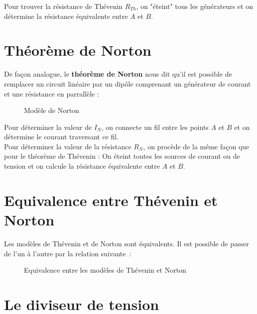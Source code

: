 Pour trouver la résistance de Thévenin $R_{Th}$, on "éteint" tous les générateurs et on détermine la résistance équivalente entre $A$ et $B$.

\section{Théorème de Norton}

De façon analogue, le \textbf{théorème de Norton} nous dit qu'il est possible de remplacer un circuit linéaire par un dipôle comprenant un générateur de courant et une résistance en parrallèle : 

\begin{figure}[!h]
\begin{center}
	
\end{center}
\caption{Modèle de Norton}
\end{figure}


Pour déterminer la valeur de $I_N$, on connecte un fil entre les points $A$ et $B$ et on détermine le courant traversant ce fil. \\

Pour déterminer la valeur de la résistance $R_N$, on procède de la même façon que pour le théorème de Thévenin : On éteint toutes les sources de courant ou de tension et on calcule la résistance équivalente entre $A$ et $B$.

\section{Equivalence entre Thévenin et Norton}

Les modèles de Thévenin et de Norton sont équivalents. Il est possible de passer de l'un à l'autre par la relation suivante~:

\begin{figure}[!h]
\begin{center}

\end{center}
\caption{Equivalence entre les modèles de Thévenin et Norton}
\end{figure}

\section{Le diviseur de tension}

